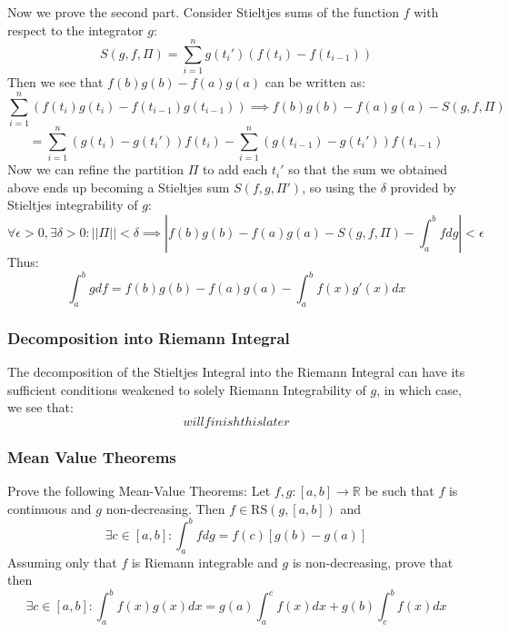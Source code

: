 \documentclass[10pt,letterpaper]{article} %
\begin{document}
Now we prove the second part. Consider Stieltjes sums of the function $f$ with respect to the integrator $g$:
\begin{equation*}
S(g, f, \Pi) = \sum_{i=1}^{n}g(t_i')(f(t_i) - f(t_{i-1}))
\end{equation*}
Then we see that $f(b)g(b) - f(a)g(a)$ can be written as:
\begin{equation*}
\sum_{i=1}^{n}(f(t_i)g(t_i) - f(t_{i-1})g(t_{i-1})) \implies f(b)g(b) - f(a)g(a) - S(g, f, \Pi)
\end{equation*}
\begin{equation*}
= \sum_{i=1}^{n}(g(t_i) - g(t_i'))f(t_i) - \sum_{i=1}^{n}(g(t_{i-1}) - g(t_i'))f(t_{i-1})
\end{equation*}
Now we can refine the partition $\Pi$ to add each $t_i'$ so that the sum we obtained above ends up becoming a Stieltjes sum $S(f, g, \Pi')$, so using the $\delta$ provided by Stieltjes integrability of $g$:
\begin{equation*}
\forall \epsilon > 0, \exists \delta > 0: ||\Pi|| < \delta \implies \left|f(b)g(b) - f(a)g(a) - S(g, f, \Pi) - \int_{a}^{b}fdg\right| < \epsilon
\end{equation*}
Thus:
\begin{equation*}
\int_{a}^{b}gdf = f(b)g(b) - f(a)g(a) - \int_{a}^{b}f(x)g'(x)dx
\end{equation*}

\subsubsection{Decomposition into Riemann Integral}
The decomposition of the Stieltjes Integral into the Riemann Integral can have its sufficient conditions weakened to solely Riemann Integrability of $g$, in which case, we see that:
\begin{equation*}
will finish this later
\end{equation*}

\subsubsection{Mean Value Theorems}
Prove the following Mean-Value Theorems: Let $f, g: [a, b] \xrightarrow{} \mathbb{R}$ be such that $f$ is continuous and $g$ non-decreasing. Then $f \in \text{RS}(g, [a, b])$ and
\begin{equation*}
\exists c \in [a, b]: \int_{a}^{b}fdg = f(c)[g(b) - g(a)]
\end{equation*}
Assuming only that $f$ is Riemann integrable and $g$ is non-decreasing, prove that then
\begin{equation*}
\exists c \in [a, b]: \int_{a}^{b}f(x)g(x)dx = g(a)\int_{a}^{c}f(x)dx + g(b)\int_{c}^{b}f(x)dx
\end{equation*}
\end{document}
